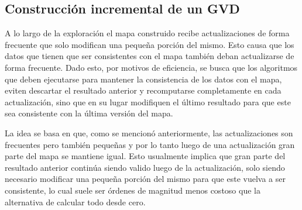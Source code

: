\subsection{Construcción incremental de un GVD}\label{subsec:constGVDInc}



A lo largo de la exploración el mapa construido recibe actualizaciones de forma frecuente que solo modifican una pequeña porción del mismo. Esto causa que los datos que tienen que ser consistentes con el mapa también deban actualizarse de forma frecuente. Dado esto, por motivos de eficiencia, se busca que los algoritmos que deben ejecutarse para mantener la consistencia de los datos con el mapa, eviten descartar el resultado anterior y recomputarse completamente en cada actualización, sino que en su lugar modifiquen el último resultado para que este sea consistente con la última versión del mapa. 

La idea se basa en que, como se mencionó anteriormente, las actualizaciones son frecuentes pero también pequeñas y por lo tanto luego de una actualización gran parte del mapa se mantiene igual. Esto usualmente implica que gran parte del resultado anterior continúa siendo valido luego de la actualización, solo siendo necesario modificar una pequeña porción del mismo para que este vuelva a ser consistente, lo cual suele ser órdenes de magnitud menos costoso que la alternativa de calcular todo desde cero. 

